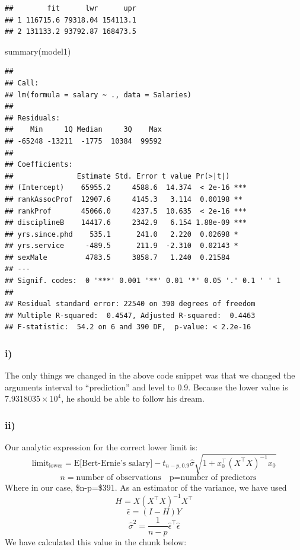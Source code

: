 \documentclass[
]{article}
\newenvironment{Shaded}{\begin{snugshade}}{\end{snugshade}}
\newcommand{\FunctionTok}[1]{\textcolor[rgb]{0.00,0.00,0.00}{#1}}
\newcommand{\NormalTok}[1]{#1}
\begin{document}
\begin{verbatim}
##        fit      lwr      upr
## 1 116715.6 79318.04 154113.1
## 2 131133.2 93792.87 168473.5
\end{verbatim}

\begin{Shaded}
\begin{Highlighting}[]
\FunctionTok{summary}\NormalTok{(model1)}
\end{Highlighting}
\end{Shaded}

\begin{verbatim}
## 
## Call:
## lm(formula = salary ~ ., data = Salaries)
## 
## Residuals:
##    Min     1Q Median     3Q    Max 
## -65248 -13211  -1775  10384  99592 
## 
## Coefficients:
##               Estimate Std. Error t value Pr(>|t|)    
## (Intercept)    65955.2     4588.6  14.374  < 2e-16 ***
## rankAssocProf  12907.6     4145.3   3.114  0.00198 ** 
## rankProf       45066.0     4237.5  10.635  < 2e-16 ***
## disciplineB    14417.6     2342.9   6.154 1.88e-09 ***
## yrs.since.phd    535.1      241.0   2.220  0.02698 *  
## yrs.service     -489.5      211.9  -2.310  0.02143 *  
## sexMale         4783.5     3858.7   1.240  0.21584    
## ---
## Signif. codes:  0 '***' 0.001 '**' 0.01 '*' 0.05 '.' 0.1 ' ' 1
## 
## Residual standard error: 22540 on 390 degrees of freedom
## Multiple R-squared:  0.4547, Adjusted R-squared:  0.4463 
## F-statistic:  54.2 on 6 and 390 DF,  p-value: < 2.2e-16
\end{verbatim}

\hypertarget{i-2}{%
\subsubsection{i)}\label{i-2}}

The only things we changed in the above code snippet was that we changed
the arguments interval to ``prediction'' and level to 0.9. Because the
lower value is \ensuremath{7.9318035\times 10^{4}}, he should be able to
follow his dream.

\hypertarget{ii-2}{%
\subsubsection{ii)}\label{ii-2}}

Our analytic expression for the correct lower limit is: \[
\text{limit}_\text{lower} = \text{E[Bert-Ernie's salary]} - t_{n-p, 0.9} \hat{\sigma}\sqrt{1+x_0^\top(X^\top X)^{-1}x_0}
\] \[
\quad n=\text{number of observations} \quad \text{p=number of predictors}
\] Where in our case, \$n-p=\$391. As an estimator of the variance, we
have used \[
H =X(X^\top X)^{-1}X^\top
\] \[
\hat{\epsilon} = (I-H)Y
\] \[
\hat{\sigma}^2 = \frac{1}{n-p}\hat{\epsilon}^\top\hat{\epsilon}
\] We have calculated this value in the chunk below:
\end{document}
